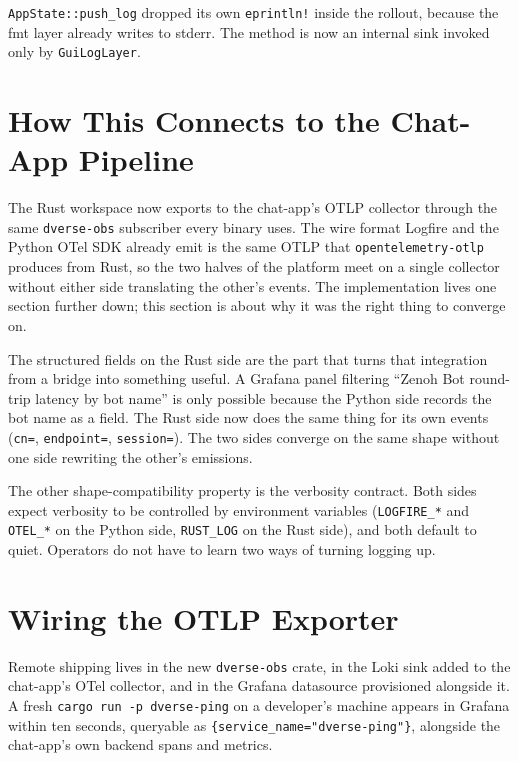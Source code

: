 \documentclass[11pt,a4paper]{article}
\begin{document}
\texttt{AppState::push\_log} dropped its own \texttt{eprintln!}
inside the rollout, because the fmt layer already writes to
stderr. The method is now an internal sink invoked only by
\texttt{GuiLogLayer}.

\section{How This Connects to the Chat-App Pipeline}

The Rust workspace now exports to the chat-app's OTLP collector
through the same \texttt{dverse-obs} subscriber every binary
uses. The wire format Logfire and the Python OTel SDK already
emit is the same OTLP that \texttt{opentelemetry-otlp} produces
from Rust, so the two halves of the platform meet on a single
collector without either side translating the other's
events. The implementation lives one section further down; this
section is about why it was the right thing to converge on.

The structured fields on the Rust side are the part that turns
that integration from a bridge into something useful. A Grafana
panel filtering ``Zenoh Bot round-trip latency by bot name'' is
only possible because the Python side records the bot name as a
field. The Rust side now does the same thing for its own events
(\texttt{cn=}, \texttt{endpoint=}, \texttt{session=}). The two
sides converge on the same shape without one side rewriting the
other's emissions.

The other shape-compatibility property is the verbosity contract.
Both sides expect verbosity to be controlled by environment
variables (\texttt{LOGFIRE\_*} and \texttt{OTEL\_*} on the
Python side, \texttt{RUST\_LOG} on the Rust side), and both
default to quiet. Operators do not have to learn two ways of
turning logging up.

\section{Wiring the OTLP Exporter}

Remote shipping lives in the new \texttt{dverse-obs} crate, in
the Loki sink added to the chat-app's OTel collector, and in
the Grafana datasource provisioned alongside it. A fresh
\texttt{cargo run -p dverse-ping} on a developer's machine
appears in Grafana within ten seconds, queryable as
\texttt{\{service\_name="dverse-ping"\}}, alongside the
chat-app's own backend spans and metrics.
\end{document}

